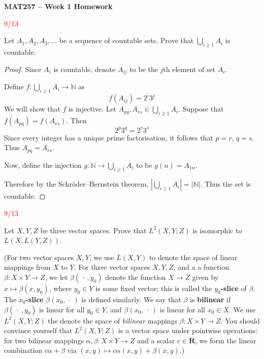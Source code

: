 \documentclass{article}
\newcommand{\R}{\mathbf{R}}
\newcommand{\due}[1]{\reversemarginpar\marginnote
    {\textcolor{red}{#1}}
    }
\theoremstyle{definition}
\begin{document}
\noindent
    {\large \textbf{MAT257 -- Week 1 Homework}}

\exercise \due{9/13}
    Let $A_1,A_2,A_3,\ldots$ be a sequence of countable sets. Prove that $\bigcup_{i\geq 1} A_i$ is countable.

\begin{proof}
    Since \(A_i\) is countable, denote \(A_{ij}\) to be the \(j\)th element of set \(A_i\).

    Define \(f: \bigcup_{i \ge 1} A_i \to \mathbb{N}\) as 
    \[
        f(A_{ij})=2^{i}3^{j}
    \]
    We will show that \(f\) is injective. Let \(A_{pq}, A_{rs} \in  \bigcup_{i \geq 1} A_i\). Suppose that \(f(A_{pq} ) = f(A_{rs} )\). Then
    \[
        2^p 3^q = 2^r 3^s
    \]
    Since every integer has a unique prime factorisation, it follows that \(p = r\), \(q = s\). Thus \(A_{pq} = A_{rs} \).

    Now, define the injection \(g: \mathbb{N} \to \bigcup_{i\geq 1} A_i\) to be \(g(n) = A_{1n} \). 
    
    Therefore by the Schröder–Bernstein theorem, \(|\bigcup_{i\geq 1} A_i | = |\mathbb{N} |\). Thus the set is countable.

\end{proof}
    
\exercise \due{9/13}
    Let $X,Y,Z$ be three vector spaces. Prove that $L^2(X,Y;Z)$ is isomorphic to $L(X,L(Y,Z))$.

   (For two vector spaces $X,Y$, we use $L(X,Y)$ to denote the space of linear mappings from $X$ to $Y$. For three vector spaces $X,Y,Z$, and a a function $\beta:X\times Y\rightarrow Z$, we let $\beta(\,\cdot\,,y_0)$ denote the function $X\rightarrow Z$ given by $x\mapsto \beta(x,y_0)$, where $y_0\in Y$ is some fixed vector; this is called the \textbf{$y_0$-slice} of $\beta$. The \textbf{$x_0$-slice} $\beta(x_0, \,\cdot\,)$ is defined similarly. We say that $\beta$ is \textbf{bilinear} if $\beta(\,\cdot\,,y_0)$ is linear for all $y_0\in Y$, and $\beta(x_0, \,\cdot\,)$ is linear for all $x_0\in X$. We use $L^2(X,Y;Z)$ the denote the space of \textit{bilinear} mappings $\beta:X\times Y\rightarrow Z$. You should convince yourself that $L^2(X,Y;Z)$ is a vector space under pointwise operations: for two bilinear mappings $\alpha,\beta:X\times Y\rightarrow Z$ and a scalar $c\in \R$, we form the linear combination $c\alpha+\beta$ via $(x,y)\mapsto c\alpha(x,y) + \beta(x,y)$.)
\end{document}
